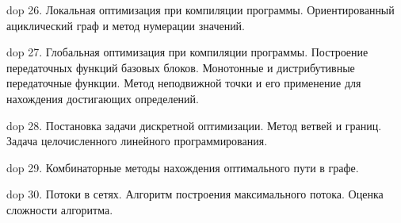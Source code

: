 dop 26. Локальная  оптимизация при  компиляции  программы. Ориентированный  ациклический  граф  и  метод нумерации значений.

dop 27. Глобальная оптимизация при компиляции программы. Построение передаточных функций базовых блоков. Монотонные и дистрибутивные передаточные функции. Метод неподвижной точки и его применение для нахождения достигающих определений.

dop 28. Постановка задачи дискретной оптимизации. Метод ветвей и границ. Задача целочисленного линейного программирования.

dop 29. Комбинаторные методы нахождения оптимального пути в графе.

dop 30. Потоки в сетях. Алгоритм построения максимального потока. Оценка сложности алгоритма.
